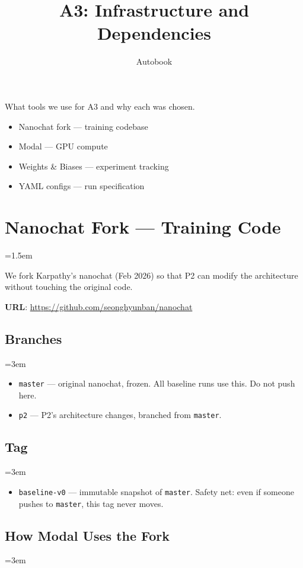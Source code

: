 \documentclass[9pt]{extarticle}
\title{\vspace{-1.2cm}\huge\textbf{A3: Infrastructure and Dependencies}\vspace{-0.5em}}
\author{\normalsize Autobook}
\date{\vspace{-1.5em}}
\begin{document}
\maketitle
\thispagestyle{fancy}

What tools we use for A3 and why each was chosen.

\begin{itemize}[nosep]
  \item Nanochat fork --- training codebase
  \item Modal --- GPU compute
  \item Weights \& Biases --- experiment tracking
  \item YAML configs --- run specification
\end{itemize}

\leftskip=0pt
\section*{Nanochat Fork --- Training Code}
\leftskip=1.5em

We fork Karpathy's nanochat (Feb 2026) so that P2 can modify the architecture without touching the original code.

\textbf{URL}: \url{https://github.com/seonghyunban/nanochat}

\subsection*{Branches}
\leftskip=3em

\begin{itemize}[nosep]
  \item \texttt{master} --- original nanochat, frozen. All baseline runs use this. Do not push here.
  \item \texttt{p2} --- P2's architecture changes, branched from \texttt{master}.
\end{itemize}

\subsection*{Tag}
\leftskip=3em

\begin{itemize}[nosep]
  \item \texttt{baseline-v0} --- immutable snapshot of \texttt{master}. Safety net: even if someone pushes to \texttt{master}, this tag never moves.
\end{itemize}

\subsection*{How Modal Uses the Fork}
\leftskip=3em
\end{document}
